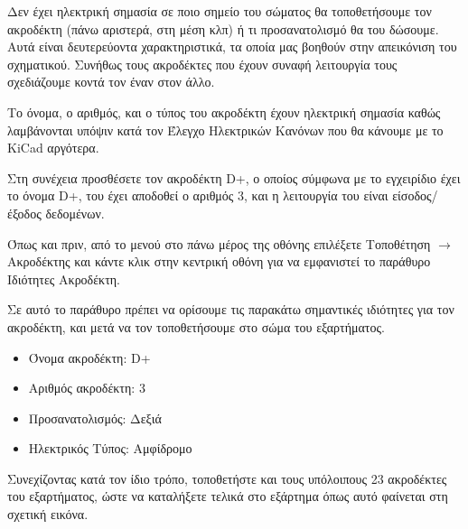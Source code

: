 \documentclass[a4paper]{article}
\begin{document}
Δεν έχει ηλεκτρική σημασία σε ποιο σημείο του σώματος θα τοποθετήσουμε τον ακροδέκτη (πάνω αριστερά, στη μέση κλπ) ή τι προσανατολισμό θα του δώσουμε. Αυτά είναι δευτερεύοντα χαρακτηριστικά, τα οποία μας βοηθούν στην απεικόνιση του σχηματικού. Συνήθως τους ακροδέκτες που έχουν συναφή λειτουργία τους σχεδιάζουμε κοντά τον έναν στον άλλο.

Το όνομα, ο αριθμός, και ο τύπος του ακροδέκτη έχουν ηλεκτρική σημασία καθώς λαμβάνονται υπόψιν κατά τον Έλεγχο Ηλεκτρικών Κανόνων που θα κάνουμε με το \textenglish{KiCad} αργότερα.

\begin{figure}
  \begin{center}
    \label{fig:kicad-main}
  \end{center}
\end{figure}

Στη συνέχεια προσθέσετε τον ακροδέκτη D+, ο οποίος σύμφωνα με το εγχειρίδιο έχει το όνομα D+, του έχει αποδοθεί ο αριθμός 3, και η λειτουργία του είναι είσοδος/έξοδος δεδομένων.

Όπως και πριν, από το μενού στο πάνω μέρος της οθόνης επιλέξετε Τοποθέτηση $\rightarrow$ Ακροδέκτης και κάντε κλικ στην κεντρική οθόνη για να εμφανιστεί το παράθυρο Ιδιότητες Ακροδέκτη.

Σε αυτό το παράθυρο πρέπει να ορίσουμε τις παρακάτω σημαντικές ιδιότητες για τον ακροδέκτη, και μετά να τον τοποθετήσουμε στο σώμα του εξαρτήματος.

\begin{itemize}
    \item Όνομα ακροδέκτη: D+
    \item Αριθμός ακροδέκτη: 3
    \item Προσανατολισμός: Δεξιά
    \item Ηλεκτρικός Τύπος: Αμφίδρομο
\end{itemize}

\begin{figure}
  \begin{center}
    \label{fig:kicad-main}
  \end{center}
\end{figure}

Συνεχίζοντας κατά τον ίδιο τρόπο, τοποθετήστε και τους υπόλοιπους 23 ακροδέκτες του εξαρτήματος, ώστε να καταλήξετε τελικά στο εξάρτημα όπως αυτό φαίνεται στη σχετική εικόνα.
\end{document}
